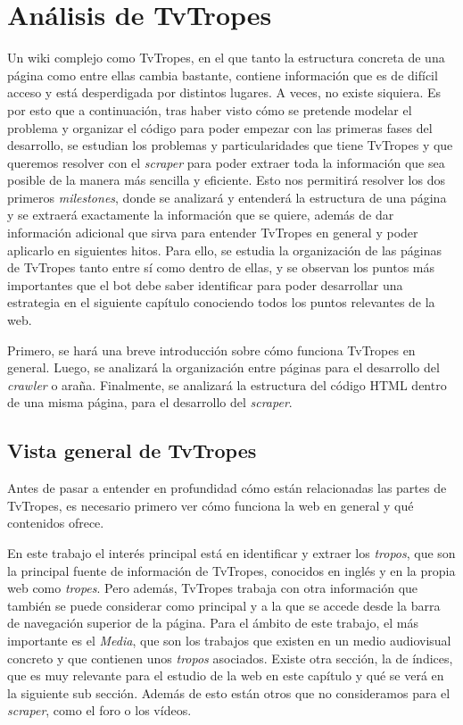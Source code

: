 \section{Análisis de TvTropes}
Un wiki complejo como TvTropes, en el que tanto la estructura concreta de una
página como entre ellas cambia bastante, contiene información que es de difícil
acceso y está desperdigada por distintos lugares. A veces, no existe siquiera.
Es por esto que a continuación, tras haber visto cómo se pretende modelar el
problema y organizar el código para poder empezar con las primeras fases del
desarrollo, se estudian los problemas y particularidades que tiene TvTropes y
que queremos resolver con el \textit{scraper} para poder extraer toda la
información que sea posible de la manera más sencilla y eficiente. Esto nos
permitirá resolver los dos primeros \textit{milestones}, donde se analizará y
entenderá la estructura de una página y se extraerá exactamente la información
que se quiere, además de dar información adicional que sirva para entender
TvTropes en general y poder aplicarlo en siguientes hitos. Para ello, se estudia
la organización de las páginas de TvTropes tanto entre sí como dentro de ellas,
y se observan los puntos más importantes que el bot debe saber identificar para
poder desarrollar una estrategia en el siguiente capítulo conociendo todos los
puntos relevantes de la web.

Primero, se hará una breve introducción sobre cómo funciona TvTropes en general.
Luego, se analizará la organización entre páginas para el desarrollo del
\textit{crawler} o araña. Finalmente, se analizará la estructura del código HTML
dentro de una misma página, para el desarrollo del \textit{scraper}.

\subsection{Vista general de TvTropes}
Antes de pasar a entender en profundidad cómo están relacionadas las partes de
TvTropes, es necesario primero ver cómo funciona la web en general y qué
contenidos ofrece.

En este trabajo el interés principal está en identificar y extraer los
\textit{tropos}, que son la principal fuente de información de TvTropes,
conocidos en inglés y en la propia web como \textit{tropes}. Pero además,
TvTropes trabaja con otra información que también se puede considerar como
principal y a la que se accede desde la barra de navegación superior de la
página. Para el ámbito de este trabajo, el más importante es el \textit{Media},
que son los trabajos que existen en un medio audiovisual concreto y que
contienen unos \textit{tropos} asociados. Existe otra sección, la de índices,
que es muy relevante para el estudio de la web en este capítulo y qué se verá en
la siguiente sub sección. Además de esto están otros que no consideramos para el
\textit{scraper}, como el foro o los vídeos.

